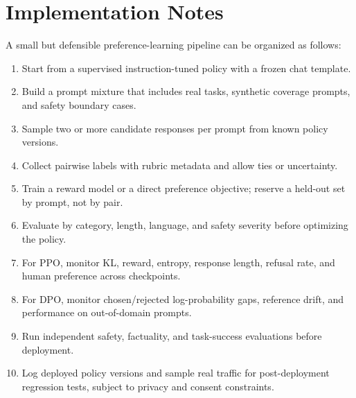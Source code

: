 \section{Implementation Notes}
A small but defensible preference-learning pipeline can be organized as follows:
\begin{enumerate}
    \item Start from a supervised instruction-tuned policy with a frozen chat template.
    \item Build a prompt mixture that includes real tasks, synthetic coverage prompts, and safety boundary cases.
    \item Sample two or more candidate responses per prompt from known policy versions.
    \item Collect pairwise labels with rubric metadata and allow ties or uncertainty.
    \item Train a reward model or a direct preference objective; reserve a held-out set by prompt, not by pair.
    \item Evaluate by category, length, language, and safety severity before optimizing the policy.
    \item For PPO, monitor KL, reward, entropy, response length, refusal rate, and human preference across checkpoints.
    \item For DPO, monitor chosen/rejected log-probability gaps, reference drift, and performance on out-of-domain prompts.
    \item Run independent safety, factuality, and task-success evaluations before deployment.
    \item Log deployed policy versions and sample real traffic for post-deployment regression tests, subject to privacy and consent constraints.
\end{enumerate}

